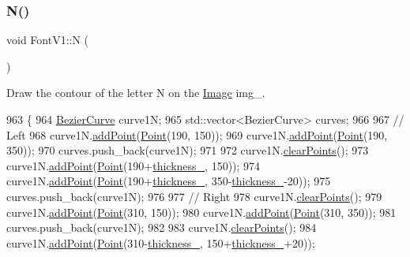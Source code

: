 \subsubsection{\texorpdfstring{N()}{N()}}
{\footnotesize\ttfamily void Font\+V1\+::N (\begin{DoxyParamCaption}{ }\end{DoxyParamCaption})}



Draw the contour of the letter N on the \mbox{\hyperlink{class_image}{Image}} img\+\_\+. 


\begin{DoxyCode}
963               \{
964     \mbox{\hyperlink{class_bezier_curve}{BezierCurve}} curve1N;
965     std::vector<BezierCurve> curves;
966 
967     \textcolor{comment}{// Left}
968     curve1N.\mbox{\hyperlink{class_bezier_curve_a38d16c18b36ae45619b05e26e226cf34}{addPoint}}(\mbox{\hyperlink{class_point}{Point}}(190, 150));
969     curve1N.\mbox{\hyperlink{class_bezier_curve_a38d16c18b36ae45619b05e26e226cf34}{addPoint}}(\mbox{\hyperlink{class_point}{Point}}(190, 350));
970     curves.push\_back(curve1N);
971 
972     curve1N.\mbox{\hyperlink{class_bezier_curve_a0ba8ce66d5af5971ae6a1b506029728e}{clearPoints}}();
973     curve1N.\mbox{\hyperlink{class_bezier_curve_a38d16c18b36ae45619b05e26e226cf34}{addPoint}}(\mbox{\hyperlink{class_point}{Point}}(190+\mbox{\hyperlink{class_font_v1_aed8040e76be9a52833627b92f0fb4e5f}{thickness\_}}, 150));
974     curve1N.\mbox{\hyperlink{class_bezier_curve_a38d16c18b36ae45619b05e26e226cf34}{addPoint}}(\mbox{\hyperlink{class_point}{Point}}(190+\mbox{\hyperlink{class_font_v1_aed8040e76be9a52833627b92f0fb4e5f}{thickness\_}}, 350-\mbox{\hyperlink{class_font_v1_aed8040e76be9a52833627b92f0fb4e5f}{thickness\_}}-20));
975     curves.push\_back(curve1N);
976 
977     \textcolor{comment}{// Right}
978     curve1N.\mbox{\hyperlink{class_bezier_curve_a0ba8ce66d5af5971ae6a1b506029728e}{clearPoints}}();
979     curve1N.\mbox{\hyperlink{class_bezier_curve_a38d16c18b36ae45619b05e26e226cf34}{addPoint}}(\mbox{\hyperlink{class_point}{Point}}(310, 150));
980     curve1N.\mbox{\hyperlink{class_bezier_curve_a38d16c18b36ae45619b05e26e226cf34}{addPoint}}(\mbox{\hyperlink{class_point}{Point}}(310, 350));
981     curves.push\_back(curve1N);
982 
983     curve1N.\mbox{\hyperlink{class_bezier_curve_a0ba8ce66d5af5971ae6a1b506029728e}{clearPoints}}();
984     curve1N.\mbox{\hyperlink{class_bezier_curve_a38d16c18b36ae45619b05e26e226cf34}{addPoint}}(\mbox{\hyperlink{class_point}{Point}}(310-\mbox{\hyperlink{class_font_v1_aed8040e76be9a52833627b92f0fb4e5f}{thickness\_}}, 150+\mbox{\hyperlink{class_font_v1_aed8040e76be9a52833627b92f0fb4e5f}{thickness\_}}+20));

\end{DoxyCode}
